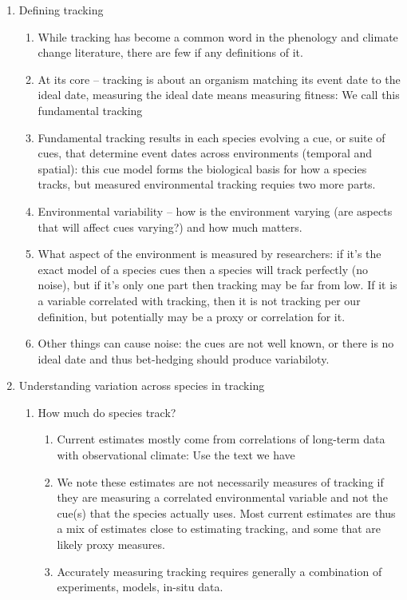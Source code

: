 \documentclass[11pt,letterpaper]{article}
\begin{document}
\begin{enumerate}
\item Defining tracking %
\begin{enumerate}
\item While tracking has become a common word in the phenology and climate change literature, there are few if any definitions of it.
\item At its core -- tracking is about an organism matching its event date to the ideal date, measuring the ideal date means measuring fitness: We call this fundamental tracking
\item Fundamental tracking results in each species evolving a cue, or suite of cues, that determine event dates across environments (temporal and spatial): this cue model forms the biological basis for how a species tracks, but measured environmental tracking requies two more parts.
\item Environmental variability -- how is the environment varying (are aspects that will affect cues varying?) and how much matters.
\item What aspect of the environment is measured by researchers: if it's the exact model of a species cues then a species will track perfectly (no noise), but if it's only one part then tracking may be far from low. If it is a variable correlated with tracking, then it is not tracking per our definition, but potentially may be a proxy or correlation for it. 
\item Other things can cause noise: the cues are not well known, or there is no ideal date and thus bet-hedging should produce variabiloty. 
\end{enumerate}
\item Understanding variation across species in tracking
\begin{enumerate}
\item How much do species track? 
\begin{enumerate}
\item Current estimates mostly come from correlations of long-term data with observational climate: Use the text we have 
\item We note these estimates are not necessarily measures of tracking if they are measuring a correlated environmental variable and not the cue(s) that the species actually uses. Most current estimates are thus a mix of estimates close to estimating tracking, and some that are likely proxy measures.
\item Accurately measuring tracking requires generally a combination of experiments, models, in-situ data. 

\end{enumerate}
\end{enumerate}
\end{enumerate}
\end{document}
